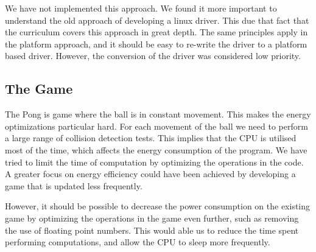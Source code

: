 We have not implemented this approach. We found it more important to understand the old approach of developing a linux driver. This due that fact that the curriculum covers this approach in great depth. The same principles apply in the platform approach, and it should be easy to re-write the driver to a platform based driver. However, the conversion of the driver was considered low priority.


\subsection{The Game}
The Pong is game where the ball is in constant movement. This makes the energy optimizations particular hard. For each movement of the ball we need to perform a large range of collision detection tests. This implies that the CPU is utilised most of the time, which affects the energy consumption of the program. We have tried to limit the time of computation by optimizing the operations in the code. A greater focus on energy efficiency could have been achieved by developing a game that is updated less frequently. 

However, it should be possible to decrease the power consumption on the existing game by optimizing the operations in the game even further, such as removing the use of floating point numbers. This would able us to reduce the time spent performing computations, and allow the CPU to sleep more frequently. 